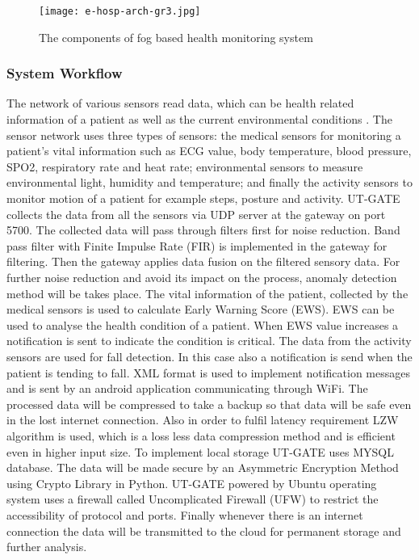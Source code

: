 \documentclass[10pt,a4paper,journal]{IEEEtran}
\begin{document}
\begin{figure}
  \centering
	\texttt{[image: e-hosp-arch-gr3.jpg]}
	\caption[The components of fog based health monitoring system ]{The components of fog based health monitoring system   \cite{7}}
\label{Fig 2} 
\end{figure}

\subsubsection{System Workflow}
	The network of various sensors read data, which can be health related information of a patient as well as the current environmental conditions \cite{7}. The sensor network uses three types of sensors: the medical sensors for monitoring a patient's vital information such as ECG value, body temperature, blood pressure, SPO2, respiratory rate and heat rate; environmental sensors to measure environmental light, humidity and temperature; and finally the activity sensors to monitor motion of a patient for example steps, posture and activity. 
	UT-GATE collects the data from all the sensors via UDP server at the gateway on port 5700. The collected data will pass through filters first for noise reduction. Band pass filter with Finite Impulse Rate (FIR) is implemented in the gateway for filtering. Then the gateway applies data fusion on the filtered sensory data. For further noise reduction and avoid its impact on the process, anomaly detection method will be takes place. The vital information of the patient, collected by the medical sensors is used to calculate Early Warning Score (EWS). EWS can be used to analyse the health condition of a patient. When EWS value increases a notification is sent to indicate the condition is critical. The data from the activity sensors are used for fall detection. In this case also a notification is send when the patient is tending to fall. XML format is used to implement notification messages and is sent by an android application communicating through WiFi.
	The processed data will be compressed to take a backup so that data will be safe even in the lost internet connection. Also in order to fulfil latency requirement LZW algorithm is used, which is a loss less data compression method and is efficient even in higher input size. To implement local storage UT-GATE uses MYSQL database. The data will be made secure by an Asymmetric Encryption Method using Crypto Library in Python. UT-GATE powered by Ubuntu operating system uses a firewall called Uncomplicated Firewall (UFW) to restrict the accessibility of protocol and ports. Finally whenever there is an internet connection the data will be transmitted to the cloud for permanent storage and further analysis.
\end{document}
